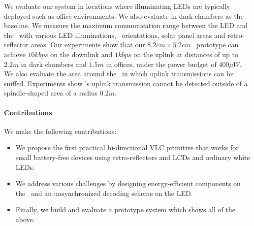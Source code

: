 
We evaluate our system in locations where illuminating LEDs are typically deployed such as office environments. We also evaluate in dark chambers as the baseline. We measure the maximum communication range between the LED and the \vitag\ with various LED illuminations, \vitag\ orientations, solar panel areas and retro-reflector areas. Our experiments show that our $8.2cm\times 5.2cm$ \vitag\ prototype can achieve $10kbps$ on the downlink and $1kbps$ on the uplink at distances of up to $2.2m$ in dark chambers and $1.5m$ in offices, under the power budget of 400$\mu W$. We also evaluate the area around the \vitag\ in which uplink transmissions can be sniffed. Experiments show \vitag's uplink transmission cannot be detected outside of a spindle-shaped area of a radius $0.2m$.

\paragraph{Contributions} 
We make the following contributions:
\begin{itemize}
\item We propose the first practical bi-directional VLC primitive that works for small battery-free devices using retro-reflectors and LCDs and ordinary white LEDs.
\item We address various challenges by designing energy-efficient components on the \vitag\ and an unsynchronized decoding scheme on the LED.
\item Finally, we build and evaluate a prototype system which shows all of the above.
\end{itemize}


